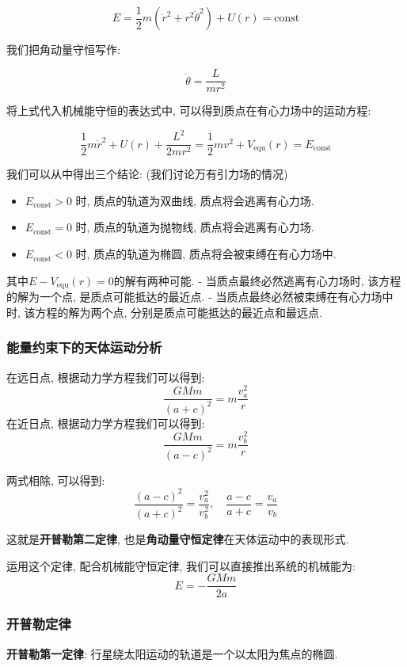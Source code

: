 \documentclass[
  a4paper,
]{ctexrep}
\providecommand{\tightlist}{%
  \setlength{\itemsep}{0pt}\setlength{\parskip}{0pt}}
\begin{document}
\[E = \frac{1}{2} m (\dot{r}^2 + r^2 \dot{\theta}^2) + U(r) = \text{const}\]

我们把角动量守恒写作:

\[\dot{\theta} = \frac{L}{m r^2}\]

将上式代入机械能守恒的表达式中, 可以得到质点在有心力场中的运动方程:

\[\frac{1}{2} m \dot{r}^2 + U(r) + \frac{L^2}{2 m r^2} = \frac{1}{2} m v^2 + V_{\text{equ}}(r)= E_{\text{const}}\]

我们可以从中得出三个结论: (我们讨论万有引力场的情况)

\begin{itemize}
\tightlist
\item
  \(E_{\text{const}} > 0\) 时, 质点的轨道为双曲线, 质点将会逃离有心力场.
\item
  \(E_{\text{const}} = 0\) 时, 质点的轨道为抛物线, 质点将会逃离有心力场.
\item
  \(E_{\text{const}} < 0\) 时, 质点的轨道为椭圆,
  质点将会被束缚在有心力场中.
\end{itemize}

其中\(E-V_{\text{equ}}(r)=0\)的解有两种可能. -
当质点最终必然逃离有心力场时, 该方程的解为一个点,
是质点可能抵达的最近点. - 当质点最终必然被束缚在有心力场中时,
该方程的解为两个点, 分别是质点可能抵达的最近点和最远点.

\subsubsection{能量约束下的天体运动分析}\label{ux80fdux91cfux7ea6ux675fux4e0bux7684ux5929ux4f53ux8fd0ux52a8ux5206ux6790}

在远日点, 根据动力学方程我们可以得到:
\[\frac{GMm}{(a+c)^2} = m \frac{v_a^2}{r}\] 在近日点,
根据动力学方程我们可以得到: \[\frac{GMm}{(a-c)^2} = m \frac{v_b^2}{r}\]

两式相除, 可以得到:
\[\frac{(a-c)^2}{(a+c)^2} = \frac{v_a^2}{v_b^2}, \quad \frac{a-c}{a+c} = \frac{v_a}{v_b}\]

这就是\textbf{开普勒第二定律},
也是\textbf{角动量守恒定律}在天体运动中的表现形式.

运用这个定律, 配合机械能守恒定律, 我们可以直接推出系统的机械能为:
\[E = -\frac{GMm}{2a}\]

\subsubsection{开普勒定律}\label{ux5f00ux666eux52d2ux5b9aux5f8b}

\textbf{开普勒第一定律}: 行星绕太阳运动的轨道是一个以太阳为焦点的椭圆.
\end{document}
